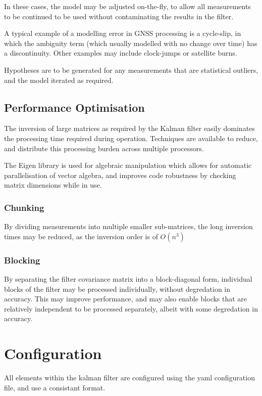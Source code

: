 In these cases, the model may be adjusted on-the-fly, to allow all measurements to be continued to be used without contaminating the results in the filter.

A typical example of a modelling error in GNSS processing is a cycle-slip, in which the ambiguity term (which usually modelled with no change over time) has a discontinuity. Other examples may include clock-jumps or satellite burns.

Hypotheses are to be generated for any measurements that are statistical outliers, and the model iterated as required.

\subsection{Performance Optimisation}

The inversion of large matrices as required by the Kalman filter easily dominates the processing time required during operation. Techniques are available to reduce, and distribute this processing burden across multiple processors.

The Eigen library is used for algebraic manipulation which allows for automatic parallelisation of vector algebra, and improves code robustness by checking matrix dimensions while in use.

\subsubsection{Chunking}

By dividing measurements into multiple smaller sub-matrices, the long inversion times may be reduced, as the inversion order is of $O(n^3)$

\subsubsection{Blocking}
By separating the filter covariance matrix into a block-diagonal form, individual blocks of the filter may be processed individually, without degredation in accuracy. This may improve performance, and may also enable blocks that are relatively independent to be processed separately, albeit with some degredation in accuracy.

\section{Configuration} \label{KFConfig}

All elements within the kalman filter are configured using the yaml configuration file, and use a consistant format.

